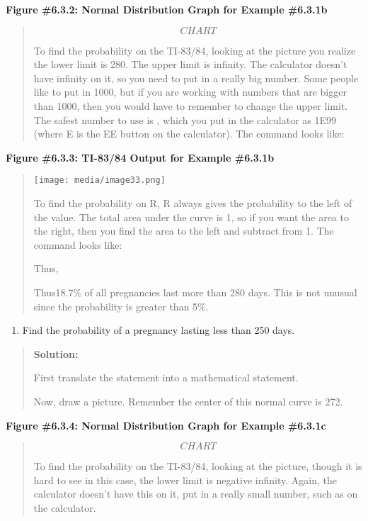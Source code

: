 \documentclass[]{book}
\providecommand{\tightlist}{%
  \setlength{\itemsep}{0pt}\setlength{\parskip}{0pt}}
\begin{document}
\textbf{Figure \#6.3.2: Normal Distribution Graph for Example \#6.3.1b}

\begin{quote}
{\[CHART\]}

To find the probability on the TI-83/84, looking at the picture you
realize the lower limit is 280. The upper limit is infinity. The
calculator doesn't have infinity on it, so you need to put in a really
big number. Some people like to put in 1000, but if you are working
with numbers that are bigger than 1000, then you would have to
remember to change the upper limit. The safest number to use is ,
which you put in the calculator as 1E99 (where E is the EE button on
the calculator). The command looks like:
\end{quote}

\textbf{Figure \#6.3.3: TI-83/84 Output for Example \#6.3.1b}

\begin{quote}
\texttt{[image: media/image33.png]}

To find the probability on R, R always gives the probability to the
left of the value. The total area under the curve is 1, so if you want
the area to the right, then you find the area to the left and subtract
from 1. The command looks like:

Thus,

Thus18.7\% of all pregnancies last more than 280 days. This is not
unusual since the probability is greater than 5\%.
\end{quote}

\begin{enumerate}
\def\labelenumi{\alph{enumi}.}
\setcounter{enumi}{2}
\tightlist
\item
  Find the probability of a pregnancy lasting less than 250 days.
\end{enumerate}

\begin{quote}
\textbf{Solution:}

First translate the statement into a mathematical statement.

Now, draw a picture. Remember the center of this normal curve is 272.
\end{quote}

\textbf{Figure \#6.3.4: Normal Distribution Graph for Example \#6.3.1c}

\begin{quote}
{\[CHART\]}

To find the probability on the TI-83/84, looking at the picture,
though it is hard to see in this case, the lower limit is negative
infinity. Again, the calculator doesn't have this on it, put in a
really small number, such as on the calculator.
\end{quote}
\end{document}
